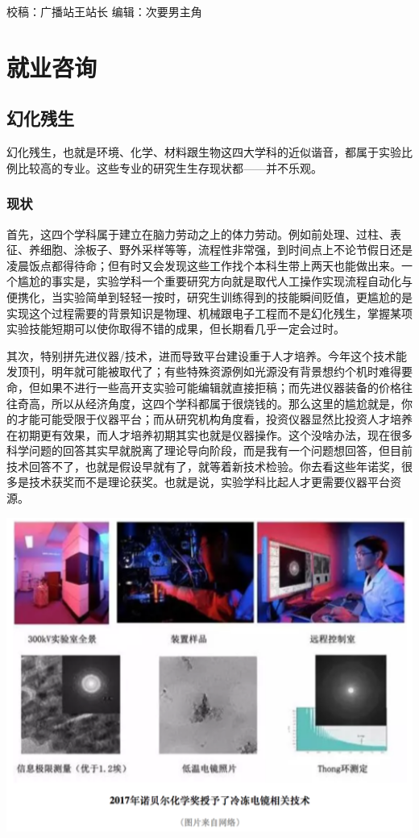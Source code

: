\documentclass[
]{book}
\begin{document}
校稿：广播站王站长
编辑：次要男主角

\hypertarget{career}{%
\chapter{就业咨询}\label{career}}

\hypertarget{ux5e7bux5316ux6b8bux751f}{%
\section{幻化残生}\label{ux5e7bux5316ux6b8bux751f}}

幻化残生，也就是环境、化学、材料跟生物这四大学科的近似谐音，都属于实验比例比较高的专业。这些专业的研究生生存现状都------并不乐观。

\hypertarget{ux73b0ux72b6}{%
\subsection{现状}\label{ux73b0ux72b6}}

首先，这四个学科属于建立在脑力劳动之上的体力劳动。例如前处理、过柱、表征、养细胞、涂板子、野外采样等等，流程性非常强，到时间点上不论节假日还是凌晨饭点都得待命；但有时又会发现这些工作找个本科生带上两天也能做出来。一个尴尬的事实是，实验学科一个重要研究方向就是取代人工操作实现流程自动化与便携化，当实验简单到轻轻一按时，研究生训练得到的技能瞬间贬值，更尴尬的是实现这个过程需要的背景知识是物理、机械跟电子工程而不是幻化残生，掌握某项实验技能短期可以使你取得不错的成果，但长期看几乎一定会过时。

其次，特别拼先进仪器/技术，进而导致平台建设重于人才培养。今年这个技术能发顶刊，明年就可能被取代了；有些特殊资源例如光源没有背景想约个机时难得要命，但如果不进行一些高开支实验可能编辑就直接拒稿；而先进仪器装备的价格往往奇高，所以从经济角度，这四个学科都属于很烧钱的。那么这里的尴尬就是，你的才能可能受限于仪器平台；而从研究机构角度看，投资仪器显然比投资人才培养在初期更有效果，而人才培养初期其实也就是仪器操作。这个没啥办法，现在很多科学问题的回答其实早就脱离了理论导向阶段，而是我有一个问题想回答，但目前技术回答不了，也就是假设早就有了，就等着新技术检验。你去看这些年诺奖，很多是技术获奖而不是理论获奖。也就是说，实验学科比起人才更需要仪器平台资源。

\includegraphics[width=6.67in]{images/hhcs1}
\end{document}
